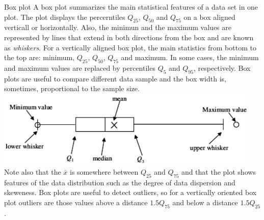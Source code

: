 \documentclass[8pt]{beamer}
\begin{document}
\begin{frame}{Box plot}
    A box plot summarizes the main statistical features of a data set in one plot. The plot displays the percerntiles $Q_{25}$, $Q_{50}$ and $Q_{75}$ on a box aligned verticall or horizontally. Also, the minimun and the maximum values are represented by lines that extend in both directions from the box and are known as \emph{whiskers}. For a vertically aligned box plot, the main statistics from bottom to the top are: minimum, $Q_{25}$, $Q_{50}$, $Q_{75}$ and maximum. In some cases, the minimum and maximum values are replaced by percentiles $Q_{5}$ and $Q_{95}$, respectively. Box plots are useful to compare different data sample and the box width is, sometimes, proportional to the sample size.
    \vspace{-0.2cm}
        \includegraphics[width=0.95\textwidth]{fiBi210.png}
        \vspace{-0.1cm}
        Note also that the $\bar{x}$ is somewhere between $Q_{25}$ and $Q_{75}$ and that the plot shows features of the data distribution such as the degree of data dispersion and skeweness. Box plots are useful to detect outliers, so for a vertically oriented box plot outliers are those  values above a distance $1.5Q_{75}$ and below a distance $1.5Q_{25}$. 
\end{frame}

\end{document}
